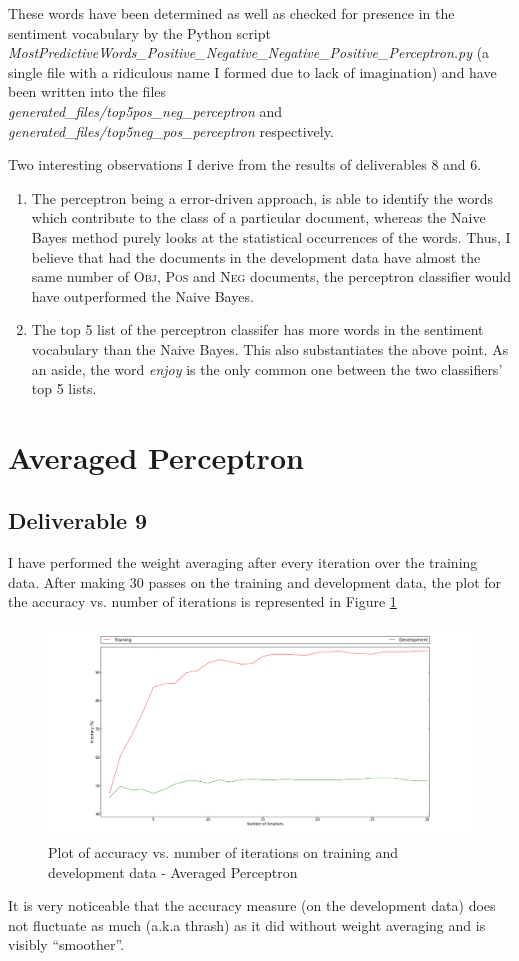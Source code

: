 \documentclass[10pt, letter]{article}
\begin{document}
These words have been determined as well as checked for presence in the sentiment vocabulary by the Python script \textit{MostPredictiveWords\_Positive\_Negative\_Negative\_Positive\_Perceptron.py} (a single file with a ridiculous name I formed due to lack of imagination) and have been written into the files \\ \textit{generated\_files/top5pos\_neg\_perceptron} and \textit{generated\_files/top5neg\_pos\_perceptron} respectively.

Two interesting observations I derive from the results of deliverables 8 and 6. 
\begin{enumerate}
	\item The perceptron being a error-driven approach, is able to identify the words which contribute to the class of a particular document, whereas the Naive Bayes method purely looks at the statistical occurrences of the words. Thus, I believe that had the documents in the development data have almost the same number of \textsc{Obj}, \textsc{Pos} and \textsc{Neg} documents, the perceptron classifier would have outperformed the Naive Bayes.
	\item The top 5 list of the perceptron classifer has more words in the sentiment vocabulary than the Naive Bayes. This also substantiates the above point. As an aside, the word \textit{enjoy} is the only common one between the two classifiers' top 5 lists.
\end{enumerate}

\section{Averaged Perceptron}
\subsection*{Deliverable 9}
I have performed the weight averaging after every iteration over the training data. After making 30 passes on the training and development data, the plot for the accuracy vs. number of iterations is represented in Figure \ref{del9}
\begin{figure}
  \centering
    \includegraphics[scale=0.25]{images/deliverable_9}
    \caption{Plot of accuracy vs. number of iterations on training and development data - Averaged Perceptron}
  \label{del9}
\end{figure}
It is very noticeable that the accuracy measure (on the development data) does not fluctuate as much (a.k.a thrash) as it did without weight averaging and is visibly ``smoother''.
\end{document}
